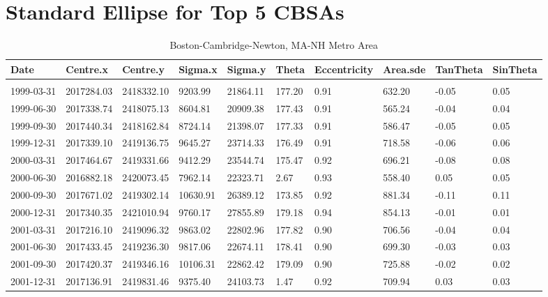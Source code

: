 \chapter{Standard Ellipse for Top 5 CBSAs}


\begin{landscape}
\singlespacing
\small
\centering
\begin{longtable}{llllllllll}
\caption{Boston-Cambridge-Newton, MA-NH Metro Area} 
\endfirsthead
\caption{Boston-Cambridge-Newton, MA-NH Metro Area} 
\endhead
Date       & Centre.x   & Centre.y   & Sigma.x  & Sigma.y  & Theta  & Eccentricity & Area.sde & TanTheta & SinTheta \\
\hline\\
1999-03-31 & 2017284.03 & 2418332.10 & 9203.99  & 21864.11 & 177.20 & 0.91         & 632.20   & -0.05    & 0.05     \\
1999-06-30 & 2017338.74 & 2418075.13 & 8604.81  & 20909.38 & 177.43 & 0.91         & 565.24   & -0.04    & 0.04     \\
1999-09-30 & 2017440.34 & 2418162.84 & 8724.14  & 21398.07 & 177.33 & 0.91         & 586.47   & -0.05    & 0.05     \\
1999-12-31 & 2017339.10 & 2419136.75 & 9645.27  & 23714.33 & 176.49 & 0.91         & 718.58   & -0.06    & 0.06     \\
2000-03-31 & 2017464.67 & 2419331.66 & 9412.29  & 23544.74 & 175.47 & 0.92         & 696.21   & -0.08    & 0.08     \\
2000-06-30 & 2016882.18 & 2420073.45 & 7962.14  & 22323.71 & 2.67   & 0.93         & 558.40   & 0.05     & 0.05     \\
2000-09-30 & 2017671.02 & 2419302.14 & 10630.91 & 26389.12 & 173.85 & 0.92         & 881.34   & -0.11    & 0.11     \\
2000-12-31 & 2017340.35 & 2421010.94 & 9760.17  & 27855.89 & 179.18 & 0.94         & 854.13   & -0.01    & 0.01     \\
2001-03-31 & 2017216.10 & 2419096.32 & 9863.02  & 22802.96 & 177.82 & 0.90         & 706.56   & -0.04    & 0.04     \\
2001-06-30 & 2017433.45 & 2419236.30 & 9817.06  & 22674.11 & 178.41 & 0.90         & 699.30   & -0.03    & 0.03     \\
2001-09-30 & 2017420.37 & 2419346.16 & 10106.31 & 22862.42 & 179.09 & 0.90         & 725.88   & -0.02    & 0.02     \\
2001-12-31 & 2017136.91 & 2419831.46 & 9375.40  & 24103.73 & 1.47   & 0.92         & 709.94   & 0.03     & 0.03     \\

\end{longtable}
\end{landscape}
